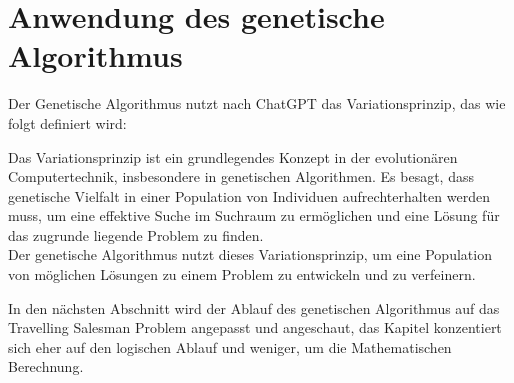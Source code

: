 %
%
%
%
\section{Anwendung des genetische Algorithmus
\label{buch:paper:varalg:section:genetic_algorithm_process}}
Der Genetische Algorithmus nutzt nach ChatGPT das Variationsprinzip, 
das wie folgt definiert wird:

\begin{displayquote}
Das Variationsprinzip ist ein grundlegendes Konzept in der 
evolutionären Computertechnik, insbesondere in genetischen 
Algorithmen. Es besagt, dass genetische Vielfalt in einer 
Population von Individuen aufrechterhalten werden muss, 
um eine effektive Suche im Suchraum zu ermöglichen und eine 
Lösung für das zugrunde liegende Problem zu finden.
\\
Der genetische Algorithmus nutzt dieses Variationsprinzip, um eine 
Population von möglichen Lösungen zu einem Problem zu entwickeln 
und zu verfeinern.\cite{chatgpt2024}
\end{displayquote}

In den nächsten Abschnitt wird der Ablauf des genetischen Algorithmus 
auf das Travelling Salesman Problem angepasst und angeschaut, das Kapitel
konzentiert sich eher auf den logischen Ablauf und weniger, um die 
Mathematischen Berechnung.









